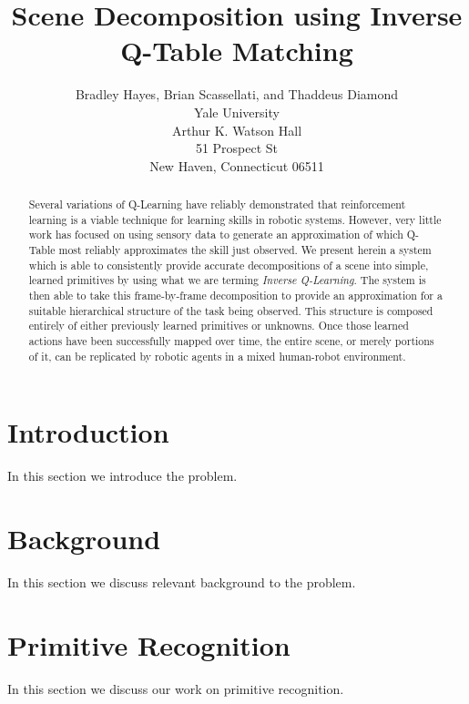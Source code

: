\documentclass[letterpaper]{article}
\begin{document}
\title{Scene Decomposition using Inverse Q-Table Matching}
\author{Bradley Hayes, Brian Scassellati, and Thaddeus Diamond\\
Yale University\\
Arthur K. Watson Hall\\
51 Prospect St\\
New Haven, Connecticut 06511\\
}

\maketitle

\begin{abstract}
Several variations of Q-Learning have reliably demonstrated that reinforcement
learning is a viable technique for learning skills in robotic systems.  However,
very little work has focused on using sensory data to generate an approximation
of which Q-Table most reliably approximates the skill just observed.  We present
herein a system which is able to consistently provide accurate decompositions of
a scene into simple, learned primitives by using what we are terming
\textit{Inverse Q-Learning}.  The system is then able to take this
frame-by-frame decomposition to provide an approximation for a suitable 
hierarchical structure of the task being observed.  This structure is composed
entirely of either previously learned primitives or unknowns.  Once those
learned actions have been successfully mapped over time, the entire scene, or
merely portions of it, can be replicated by robotic agents in a mixed
human-robot environment.  
\end{abstract}

\section{Introduction}
\label{sec:intro}
In this section we introduce the problem.

\section{Background}
\label{sec:background}
In this section we discuss relevant background to the problem.

\section{Primitive Recognition}
\label{sec:recognition}
In this section we discuss our work on primitive recognition.
\end{document}
